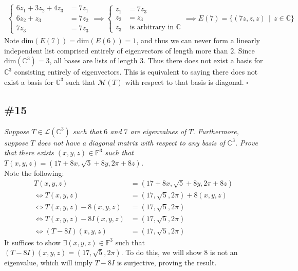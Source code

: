 \documentclass[12pt]{article}
\newcommand{\suchthat}{\, \mid \,}
\begin{document}
\begin{align*}
	\begin{cases}
		6z_1 + 3z_2 + 4z_3 &= 7z_1 \\
		6z_2 + z_3 &= 7z_2 \\
		7z_3 &= 7z_3
	\end{cases}
	\implies\begin{cases}
		z_1 &= 7z_3 \\
		z_2 &= z_3 \\
		z_3 &\text{ is arbitrary in $\mathbb{C}$}
	\end{cases}
	\implies E(7) = \{(7z, z, z) \suchthat z \in \mathbb{C}\}
\end{align*}
Note $\text{dim}(E(7)) = \text{dim}(E(6)) = 1$, and thus we can never form a linearly independent list comprised entirely of eigenvectors of length more than $2$.  Since $\text{dim}(\mathbb{C}^3) = 3$, all bases are lists of length $3$.  Thus there does not exist a basis for $\mathbb{C}^3$ consisting entirely of eigenvectors.  This is equivalent to saying there does not exist a basis for $\mathbb{C}^3$ such that $\mathcal{M}(T)$ with respect to that basis is diagonal. \hfill $\square$

\subsection*{\#15}
{\it Suppose $T \in \mathcal{L}(\mathbb{C}^3)$ such that $6$ and $7$ are eigenvalues of $T$.  Furthermore, suppose $T$ does not have a diagonal matrix with respect to any basis of $\mathbb{C}^3$.  Prove that there exists $(x, y, z) \in \mathbb{F}^3$ such that $T(x, y, z) = (17 + 8x, \sqrt{5} + 8y, 2\pi + 8z)$.}\\

\noindent Note the following:
\begin{align*}
	T(x, y, z) &= (17 + 8x, \sqrt{5} + 8y, 2\pi + 8z) \\
	\iff T(x, y, z) &= (17, \sqrt{5}, 2\pi) + 8(x, y, z) \\
	\iff T(x, y, z) - 8(x, y, z) &= (17, \sqrt{5}, 2\pi) \\
	\iff T(x, y, z) - 8I(x, y, z) &= (17, \sqrt{5}, 2\pi) \\
	\iff (T - 8I)(x, y, z) &= (17, \sqrt{5}, 2\pi)
\end{align*}
It suffices to show $\exists(x, y, z) \in \mathbb{F}^3$ such that $(T - 8I)(x, y, z) = (17, \sqrt{5}, 2\pi)$.  To do this, we will show $8$ is not an eigenvalue, which will imply $T - 8I$ is surjective, proving the result. \\
\end{document}
